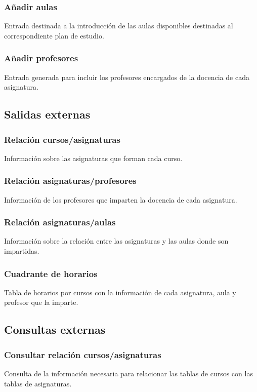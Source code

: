 \documentclass[11pt,a4paper,spanish,twoside]{book}
\begin{document}
\subsubsection{Añadir aulas}
Entrada destinada a la introducción de las aulas disponibles destinadas al
correspondiente plan de estudio.

\subsubsection{Añadir profesores}
Entrada generada para incluir los profesores encargados de la docencia de
cada asignatura.

\subsection{Salidas externas}
\subsubsection{Relación cursos/asignaturas}
Información sobre las asignaturas que forman cada curso.

\subsubsection{Relación asignaturas/profesores}
Información de los profesores que imparten la docencia de cada asignatura.

\subsubsection{Relación asignaturas/aulas}
Información sobre la relación entre las asignaturas y las aulas donde son
impartidas. 

\subsubsection{Cuadrante de horarios}
Tabla de horarios por cursos con la información de cada asignatura, aula y
profesor que la imparte.

\subsection{Consultas externas}
\subsubsection{Consultar relación cursos/asignaturas}
Consulta de la información necesaria para relacionar las tablas de
cursos con las tablas de asignaturas.
\end{document}
